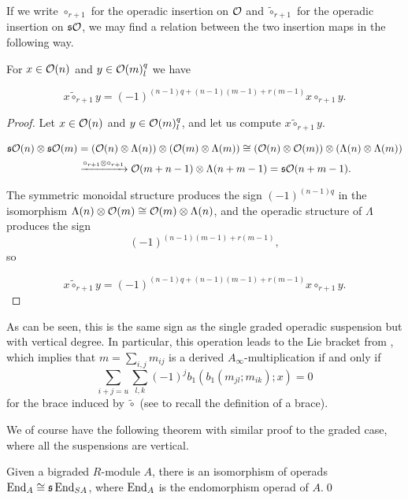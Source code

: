 \documentclass[join.tex]{subfiles}
\begin{document}
If we write $\circ_{r+1}$ for the operadic insertion on ${\mathcal O}$ and $\tilde{\circ}_{r+1}$ for the operadic insertion on $\mathfrak{s}{\mathcal O}$, we may find a relation between the two insertion maps in the following way. 

\begin{lem}
For $x\in{\mathcal O}(n)$ and $y\in{\mathcal O}(m)^{q}_l$ we have

\begin{equation}\label{sign}
x\tilde{\circ}_{r+1}y=(-1)^{(n-1)q+(n-1)(m-1)+r(m-1)}x\circ_{r+1} y.
\end{equation}

\end{lem}

\begin{proof}
Let $x\in{\mathcal O}(n)$ and $y\in{\mathcal O}(m)^{q}_l$, and let us compute $x\tilde{\circ}_{r+1} y$.

\begin{align*}
\mathfrak{s}{\mathcal O}(n)\otimes\mathfrak{s}{\mathcal O}(m)&=({\mathcal O}(n)\otimes\Lambda(n))\otimes ({\mathcal O}(m)\otimes\Lambda(m))\cong ({\mathcal O}(n)\otimes {\mathcal O}(m))\otimes (\Lambda(n)\otimes \Lambda(m))\\
&\xrightarrow{\circ_{r+1}\otimes\circ_{r+1}} {\mathcal O}(m+n-1)\otimes \Lambda(n+m-1)=\mathfrak{s}{\mathcal O}(n+m-1).
\end{align*}

The symmetric monoidal structure produces the sign $(-1)^{(n-1)q}$ in the isomorphism $\Lambda(n)\otimes {\mathcal O}(m)\cong{\mathcal O}(m)\otimes\Lambda(n)$, and the operadic structure of $\Lambda$ produces the sign \[(-1)^{(n-1)(m-1)+r(m-1)},\] so 

\[
x\tilde{\circ}_{r+1}y=(-1)^{(n-1)q+(n-1)(m-1)+r(m-1)}x\circ_{r+1} y.
\]

\end{proof}


\begin{remark}
As can be seen, this is the same sign as the single graded operadic suspension but with vertical degree. In particular, this operation leads to the Lie bracket from \cite{RW}, which implies that $m=\sum_{i,j}m_{ij}$ is a derived $A_\infty$-multiplication if and only if
\begin{equation}\label{sharp}
\sum_{i+j=u}\sum_{l,k}(-1)^jb_1(b_1(m_{jl};m_{ik});x)=0
\end{equation}
for the brace induced by $\tilde{\circ}$ (see  to recall the definition of a brace).
\end{remark}

We of course have the following theorem with similar proof to the graded case, where all the suspensions are vertical.
\begin{thm}
Given a bigraded $R$-module $A$, there is an isomorphism of operads $\operatorname{End}_{ A}\cong \mathfrak{s}\operatorname{End}_{SA}$, where $\operatorname{End}_A$ is the endomorphism operad of $A$.\qed
\end{thm}
\end{document}
